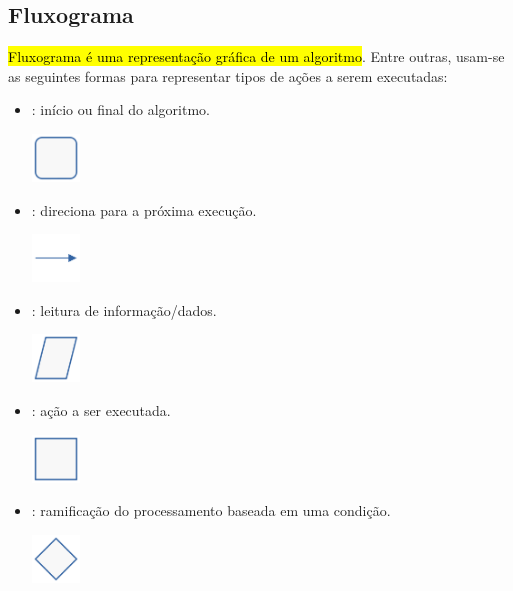 \subsection{Fluxograma}

\hl{Fluxograma é uma representação gráfica de um algoritmo}. Entre outras, usam-se as seguintes formas para representar tipos de ações a serem executadas:

\begin{itemize}
\item {}: início ou final do algoritmo.
  \begin{center}
    \includegraphics[width=0.5in]{./cap_lingua/dados/fig_fluxograma/terminal.png}
  \end{center}  
\item {}: direciona para a próxima execução.
  \begin{center}
    \includegraphics[width=0.5in]{./cap_lingua/dados/fig_fluxograma/linha.png}
  \end{center}
\item {}: leitura de informação/dados.
  \begin{center}
    \includegraphics[width=0.5in]{./cap_lingua/dados/fig_fluxograma/entrada.png}
  \end{center}  
\item {}: ação a ser executada.
  \begin{center}
    \includegraphics[width=0.5in]{./cap_lingua/dados/fig_fluxograma/processo.png}
  \end{center}
\item {}: ramificação do processamento baseada em uma condição.
  \begin{center}
    \includegraphics[width=0.5in]{./cap_lingua/dados/fig_fluxograma/decisao.png}

\end{center}
\end{itemize}

